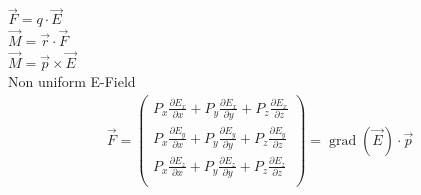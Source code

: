 \documentclass[a4paper]{scrartcl}
\begin{document}
$ \vec{F}=q\cdot\vec{E}$\\

$ \vec{M}=\vec{r}\cdot\vec{F}$\\

$ \vec{M}=\vec{p}\times\vec{E}$\\

Non uniform E-Field\\

\begin{align}
\vec F = \begin{pmatrix}
P_x \frac{\partial E_x}{\partial x} + P_y \frac{\partial E_x}{\partial y} + P_z
\frac{\partial E_x}{\partial z}\\
P_x \frac{\partial E_y}{\partial x} + P_y \frac{\partial E_y}{\partial y} + P_z
\frac{\partial E_y}{\partial z}\\
P_x \frac{\partial E_z}{\partial x} + P_y \frac{\partial E_z}{\partial y} + P_z
\frac{\partial E_z}{\partial z}\\
\end{pmatrix}
= \operatorname{grad} (\vec E) \cdot \vec p
\end{align}
\end{document}
